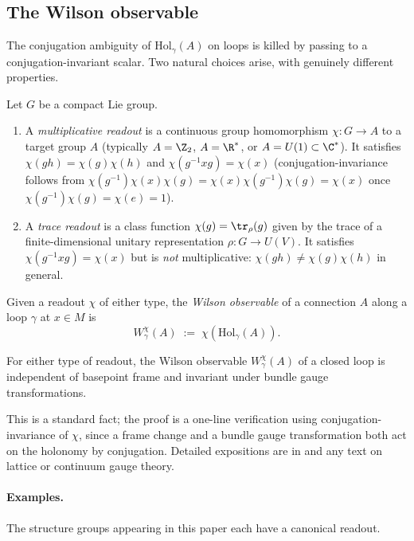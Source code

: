 \subsection{The Wilson observable}\label{ssec:wilson-def}

The conjugation ambiguity of $\mathrm{Hol}_\gamma(A)$ on loops is
killed by passing to a conjugation-invariant scalar. Two natural
choices arise, with genuinely different properties.

\begin{definition}\label{def:wilson}
Let $G$ be a compact Lie group.
\begin{enumerate}[label=(\arabic*),leftmargin=2em]
\item A \emph{multiplicative readout} is a continuous group
homomorphism $\chi\colon G\to A$ to a target group $A$ (typically
$A=\Z_2$, $A=\R^*$, or $A=U(1)\subset\C^*$). It satisfies
$\chi(gh)=\chi(g)\chi(h)$ and $\chi(g^{-1}xg)=\chi(x)$
(conjugation-invariance follows from $\chi(g^{-1})\chi(x)\chi(g)=
\chi(x)\chi(g^{-1})\chi(g)=\chi(x)$ once $\chi(g^{-1})\chi(g)=\chi(e)
=1$).
\item A \emph{trace readout} is a class function
$\chi(g)=\tr_\rho(g)$ given by the trace of a finite-dimensional
unitary representation $\rho\colon G\to U(V)$. It satisfies
$\chi(g^{-1}xg)=\chi(x)$ but is \emph{not} multiplicative:
$\chi(gh)\neq\chi(g)\chi(h)$ in general.
\end{enumerate}
Given a readout $\chi$ of either type, the \emph{Wilson observable}
of a connection $A$ along a loop $\gamma$ at $x\in M$ is
\[
   W_\gamma^\chi(A) \;:=\; \chi(\mathrm{Hol}_\gamma(A)).
\]
\end{definition}

\begin{proposition}\label{prop:wilson-gauge-invariance}
For either type of readout, the Wilson observable $W_\gamma^\chi(A)$
of a closed loop is independent of basepoint frame and invariant
under bundle gauge transformations.
\end{proposition}

This is a standard fact; the proof is a one-line verification using
conjugation-invariance of $\chi$, since a frame change and a bundle
gauge transformation both act on the holonomy by conjugation.
Detailed expositions are in \cite{KobayashiNomizu} and any text on
lattice or continuum gauge theory.

\paragraph{Examples.} The structure groups appearing in this paper
each have a canonical readout.

